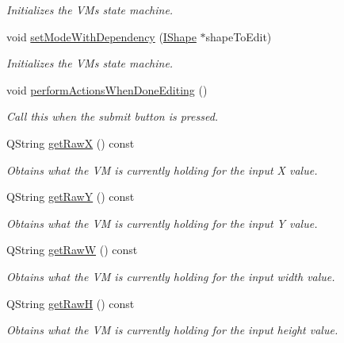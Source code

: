 \begin{DoxyCompactItemize}
\begin{DoxyCompactList}\small\item\em Initializes the VM\textquotesingle{}s state machine. \end{DoxyCompactList}\item 
void \mbox{\hyperlink{class_v_m_editor_rect_frame_abedc584604fbdc11e18898e7e0951dc3}{set\+Mode\+With\+Dependency}} (\mbox{\hyperlink{class_i_shape}{I\+Shape}} $\ast$shape\+To\+Edit)
\begin{DoxyCompactList}\small\item\em Initializes the VM\textquotesingle{}s state machine. \end{DoxyCompactList}\item 
void \mbox{\hyperlink{class_v_m_editor_rect_frame_ac6a551f7a631ed2b7ca4c48c7883fdfb}{perform\+Actions\+When\+Done\+Editing}} ()
\begin{DoxyCompactList}\small\item\em Call this when the submit button is pressed. \end{DoxyCompactList}\item 
Q\+String \mbox{\hyperlink{class_v_m_editor_rect_frame_abb4f009c3158864d941b06a534627407}{get\+RawX}} () const
\begin{DoxyCompactList}\small\item\em Obtains what the VM is currently holding for the input X value. \end{DoxyCompactList}\item 
Q\+String \mbox{\hyperlink{class_v_m_editor_rect_frame_a46d9f854d0ffbac7f7e58f115da98ef0}{get\+RawY}} () const
\begin{DoxyCompactList}\small\item\em Obtains what the VM is currently holding for the input Y value. \end{DoxyCompactList}\item 
Q\+String \mbox{\hyperlink{class_v_m_editor_rect_frame_afd8cd030942478a3e2072a934dc099a5}{get\+RawW}} () const
\begin{DoxyCompactList}\small\item\em Obtains what the VM is currently holding for the input width value. \end{DoxyCompactList}\item 
Q\+String \mbox{\hyperlink{class_v_m_editor_rect_frame_a05a412c6f1b55fbd9b78ecdb71f6b327}{get\+RawH}} () const
\begin{DoxyCompactList}\small\item\em Obtains what the VM is currently holding for the input height value. \end{DoxyCompactList}\end{DoxyCompactItemize}



